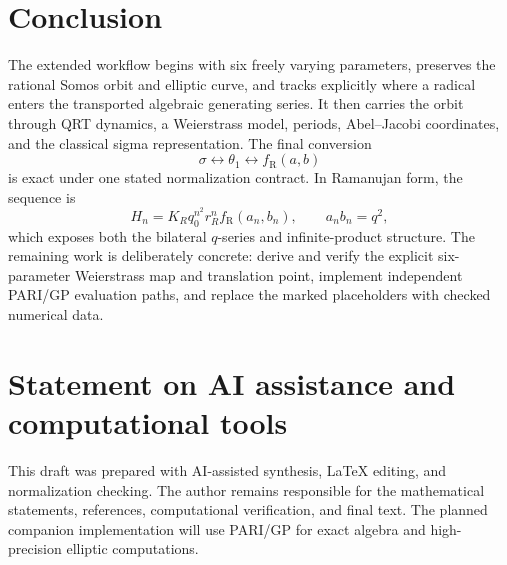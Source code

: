 \documentclass[11pt]{article}
\newcommand{\RamF}{f_{\mathrm R}}
\begin{document}
\section{Conclusion}
The extended workflow begins with six freely varying parameters, preserves the
rational Somos orbit and elliptic curve, and tracks explicitly where a radical
enters the transported algebraic generating series.  It then carries the orbit
through QRT dynamics, a Weierstrass model, periods, Abel--Jacobi coordinates,
and the classical sigma representation.  The final conversion
\[
 \sigma\longleftrightarrow\theta_1\longleftrightarrow\RamF(a,b)
\]
is exact under one stated normalization contract.  In Ramanujan form, the
sequence is
\[
 H_n=K_Rq_0^{n^2}r_R^n\RamF(a_n,b_n),
 \qquad a_nb_n=q^2,
\]
which exposes both the bilateral $q$-series and infinite-product structure.
The remaining work is deliberately concrete: derive and verify the explicit
six-parameter Weierstrass map and translation point, implement independent
PARI/GP evaluation paths, and replace the marked placeholders with checked
numerical data.

\section*{Statement on AI assistance and computational tools}
This draft was prepared with AI-assisted synthesis, \LaTeX{} editing, and
normalization checking.  The author remains responsible for the mathematical
statements, references, computational verification, and final text.  The
planned companion implementation will use PARI/GP for exact algebra and
high-precision elliptic computations.
\end{document}
